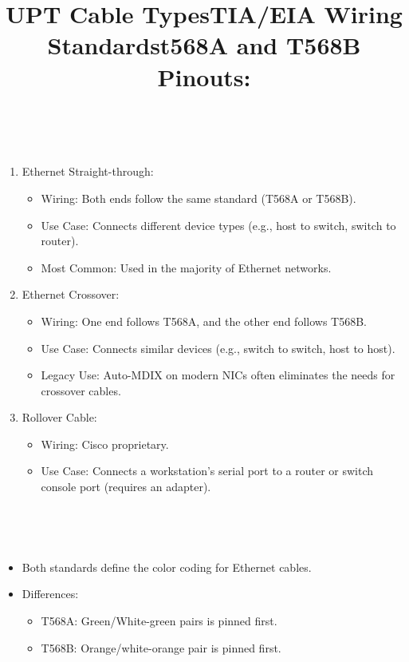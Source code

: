 \documentclass[a4paper,11pt]{article}
\begin{document}
\title{UPT Cable Types}\\
\begin{enumerate}
    \item Ethernet Straight-through:\\
    \begin{itemize}
        \item Wiring: Both ends follow the same standard (T568A or T568B).\\
        \item Use Case: Connects different device types (e.g., host to switch, switch to router).\\
        \item Most Common: Used in the majority of Ethernet networks.
    \end{itemize}
    \item Ethernet Crossover:\\
    \begin{itemize}
        \item Wiring: One end follows T568A, and the other end follows T568B.\\
        \item Use Case: Connects similar devices (e.g., switch to switch, host to host).\\
        \item Legacy Use: Auto-MDIX on modern NICs often eliminates the needs for crossover cables.\\
    \end{itemize}
    \item Rollover Cable:\\
    \begin{itemize}
        \item Wiring: Cisco proprietary.\\
        \item Use Case: Connects a workstation's serial port to a router or switch console port (requires an adapter).\\
    \end{itemize}
\end{enumerate}

\title{TIA/EIA Wiring Standards}\\
\title{t568A and T568B Pinouts:}\\
\begin{itemize}
    \item Both standards define the color coding for Ethernet cables.\\
    \item Differences:\\
    \begin{itemize}
        \item T568A: Green/White-green pairs is pinned first.\\
        \item T568B: Orange/white-orange pair is pinned first.\\
    \end{itemize}
\end{itemize}
\end{document}
